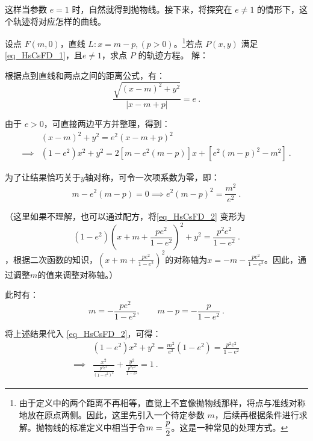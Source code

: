 这样当参数 $e = 1$ 时，自然就得到抛物线。接下来，将探究在 $e \ne 1$ 的情形下，这个轨迹将对应怎样的曲线。

\begin{example}{设点 $F(m,0)$，直线 $L : x = m - p,(p>0)$。\footnote{由于定义中的两个距离不再相等，直觉上不宜像抛物线那样，将点与准线对称地放在原点两侧。因此，这里先引入一个待定参数 $m$，后续再根据条件进行求解。抛物线的标准定义中相当于令$\displaystyle m={p\over2}$。这是一种常见的处理方式。}若点 $P(x,y)$ 满足 \autoref{eq_HsCsFD_1}，且$e\neq 1$，求点 $P$ 的轨迹方程。}\label{ex_HsCsFD_1}
解：

根据点到直线和两点之间的距离公式，有：
\begin{equation}\label{eq_HsCsFD_7}
\frac{\sqrt{(x - m)^2 + y^2}}{|x - m + p|} = e~.
\end{equation}

由于 $e > 0$，可直接两边平方并整理，得到：
\begin{equation}\label{eq_HsCsFD_2}
\begin{split}
&(x - m)^2 + y^2 = e^2(x - m + p)^2\\
\implies &(1 - e^2)x^2 + y^2 = 2[m - e^2(m - p)]x + [e^2(m - p)^2 - m^2]~.
\end{split}
\end{equation}

为了让结果恰巧关于$y$轴对称，可令一次项系数为零，即：
\begin{equation}
m - e^2(m - p) = 0\implies e^2(m - p)^2 = \frac{m^2}{e^2}~.
\end{equation}

（这里如果不理解，也可以通过配方，将\autoref{eq_HsCsFD_2} 变形为
\begin{equation}\label{eq_HsCsFD_9}
(1 - e^2)\left(x+m+\frac{pe^2}{1-e^2}\right)^2 + y^2 = \frac{p^2 e^2}{1 - e^2}~.
\end{equation}
，根据二次函数的知识，$\displaystyle\left(x+m+\frac{pe^2}{1-e^2}\right)^2$的对称轴为$\displaystyle x=-m-\frac{pe^2}{1-e^2}$。因此，通过调整$m$的值来调整对称轴。）

此时有：
\begin{equation}\label{eq_HsCsFD_5}
m = -\frac{pe^2}{1 - e^2}, \qquad m-p= -\frac{p}{1 - e^2}~.
\end{equation}

将上述结果代入 \autoref{eq_HsCsFD_2}，可得：
\begin{equation}\label{eq_HsCsFD_3}
\begin{split}
&(1 - e^2)x^2 + y^2 = \frac{m^2}{e^2}(1 - e^2) = \frac{p^2 e^2}{1 - e^2}\\
\implies&\frac{x^2}{\displaystyle\frac{p^2 e^2}{(1 - e^2)^2}} + \frac{y^2}{\displaystyle\frac{p^2 e^2}{1 - e^2}} = 1~.
\end{split}
\end{equation}


\end{example}
